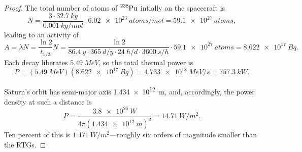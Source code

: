 \documentclass{article}
\begin{document}
\begin{proof}
  The total number of atoms of $\ce{^{238}Pu}$ intially on the spacecraft is
  \[
    N = \frac{3 \cdot \SI{32.7}{kg}}{\SI{0.001}{kg / mol}} \cdot \SI{6.02e23}{atoms / mol} = \SI{59.1e27}{atoms},
  \]
  leading to an activity of
  \[
    A = \lambda N = \frac{\ln 2}{t_{1/2}}N = \frac{\ln 2}{\SI{86.4}{y} \cdot \SI{365}{d/y} \cdot \SI{24}{h/d} \cdot \SI{3600}{s/h}}
    \cdot \SI{59.1e27}{atoms}
    = \SI{8.622e17}{Bq}.
  \]
  Each decay liberates $\SI{5.49}{MeV}$, so the total thermal power is
  \[
    P = (\SI{5.49}{MeV})(\SI{8.622e17}{Bq}) = \SI{4.733e18}{MeV/s} = \SI{757.3}{kW}.
  \]

  Saturn's orbit has semi-major axis \SI{1.434e12}{m}, and, accordingly, the power density at such a distance is
  \[
    P = \frac{\SI{3.8e26}{W}}{4\pi(\SI{1.434e12}{m})^{2}} = \SI{14.71}{W/m^{2}}.
  \]
  Ten percent of this is $\SI{1.471}{W/m^{2}}$---roughly six orders of magnitude smaller than the RTGs.
\end{proof}
\end{document}
